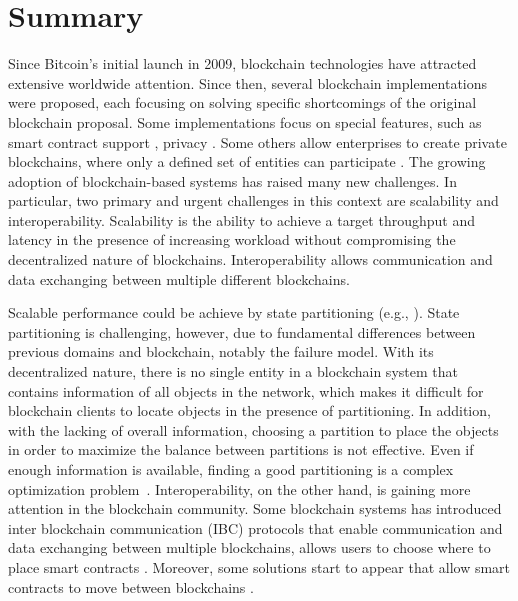 \newpage
\section{Summary}
Since Bitcoin's initial launch in 2009, blockchain technologies have attracted
extensive worldwide attention. Since then, several blockchain implementations
were proposed, each focusing on solving specific shortcomings of the original
blockchain proposal. Some implementations focus on special features, such as
smart contract support \cite{buterin2013ethereum, elrom2019neo}, privacy
\cite{alonso2018monero}. Some others allow enterprises to create private
blockchains, where only a defined set of entities can participate
\cite{androulaki2018hyperledger}. The growing adoption of blockchain-based
systems has raised many new challenges. In particular, two primary and urgent
challenges in this context are scalability and interoperability. Scalability is
the ability to achieve a target throughput and latency in the presence of
increasing workload without compromising the decentralized nature of
blockchains. Interoperability allows communication and data exchanging between
multiple different blockchains. 

Scalable performance could be achieve by state partitioning (e.g.,
\cite{facebookTAO, sciascia2012sdur, aguilera2007sinfonia}). State partitioning
is challenging, however, due to fundamental differences between previous domains
and blockchain, notably the failure model. With its decentralized nature, there
is no single entity in a blockchain system that contains information of all
objects in the network, which makes it difficult for blockchain clients to
locate objects in the presence of partitioning. In addition, with the lacking of
overall information, choosing a partition to place the objects in order to
maximize the balance between partitions is not effective. Even if enough
information is available, finding a good partitioning is a complex optimization
problem~\cite{curino2010sch,taft2014est}. Interoperability, on the other hand,
is gaining more attention in the blockchain community. Some blockchain systems
has introduced inter blockchain communication (IBC) protocols that enable
communication and data exchanging between multiple blockchains, allows users to
choose where to place smart contracts \cite{kwon2016cosmos, thomas2015protocol,
kokoris2018omniledger, al2017chainspace}. Moreover, some solutions start to
appear that allow smart contracts to move between blockchains
\cite{fynn2020move, back2014enabling, herlihy2018atomic}.

